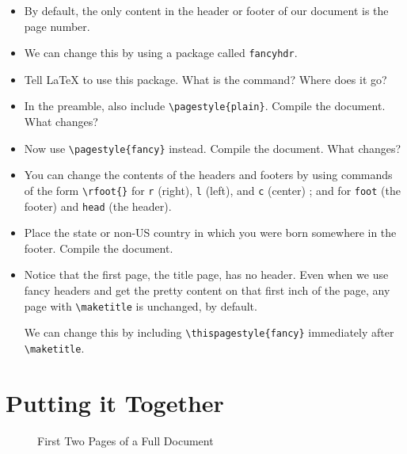 \begin{itemize}

\item By default, the only content in the header or footer of our
  document is the page number.

\item We can change this by using a package called \texttt{fancyhdr}.

\item Tell \LaTeX{} to use this package. What is the command? Where
  does it go?

\item In the preamble, also include \verb=\pagestyle{plain}=.  Compile the
  document. What changes?

\item Now use \verb=\pagestyle{fancy}= instead. Compile the document. What
  changes?

\item You can change the contents of the headers and footers by using commands
  of the form \texttt{\textbackslash rfoot\{\}} for \texttt{r} (right),
  \texttt{l} (left), and \texttt{c} (center) ; and for \texttt{foot} (the
  footer) and \texttt{head} (the header).

\item Place the state or non-US country in which you were born somewhere in the
  footer. Compile the document.

\item Notice that the first page, the title page, has no header. Even when we
  use fancy headers and get the pretty content on that first inch of the page,
  any page with \verb=\maketitle= is unchanged, by default.

  We can change this by including \verb=\thispagestyle{fancy}= immediately after
  \verb=\maketitle=.
\end{itemize}

\section{Putting it Together}



\begin{figure}[h]
  \centering
  \caption{First Two Pages of a Full Document}
\end{figure}


